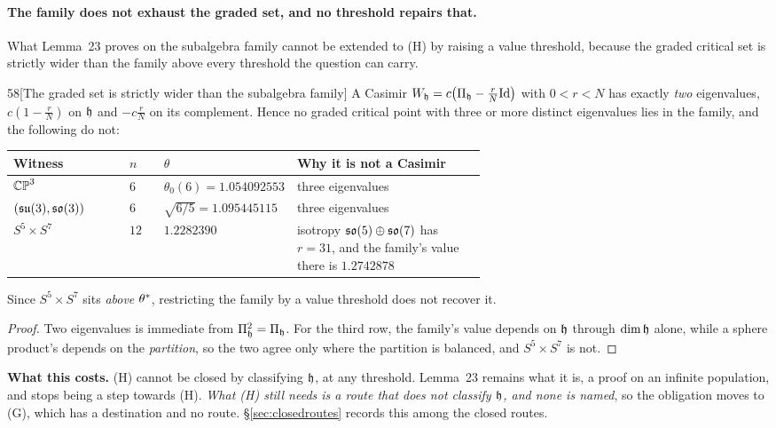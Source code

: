 \paragraph{The family does not exhaust the graded set, and no threshold repairs that.} What Lemma~23 proves on the subalgebra family cannot be extended to (H) by raising a value threshold, because the graded critical set is strictly wider than the family above every threshold the question can carry.

\begin{Lem}{58}[The graded set is strictly wider than the subalgebra family]
A Casimir $W_{\mathfrak{h}}=c\big(\Pi_{\mathfrak{h}}-\tfrac rN\mathrm{Id}\big)$ with $0<r<N$ has exactly \emph{two} eigenvalues, $c(1-\tfrac rN)$ on $\mathfrak{h}$ and $-c\tfrac rN$ on its complement. Hence no graded critical point with three or more distinct eigenvalues lies in the family, and the following do not:
\begin{center}
\begin{tabular}{@{}llp{0.22\linewidth}p{0.40\linewidth}@{}}
\toprule
Witness & $n$ & $\theta$ & Why it is not a Casimir \\
\midrule
$\mathbb{CP}^3$ & $6$ & $\theta_0(6)=1.054092553$ & three eigenvalues \\
$(\mathfrak{su}(3),\mathfrak{so}(3))$ & $6$ & $\sqrt{6/5}=1.095445115$ & three eigenvalues \\
$S^5\times S^7$ & $12$ & $1.2282390$ & isotropy $\mathfrak{so}(5)\oplus\mathfrak{so}(7)$ has $r=31$, and the family's value there is $1.2742878$ \\
\bottomrule
\end{tabular}
\end{center}
Since $S^5\times S^7$ sits \emph{above} $\theta^{*}$, restricting the family by a value threshold does not recover it.
\end{Lem}

\begin{proof}
Two eigenvalues is immediate from $\Pi_{\mathfrak{h}}^2=\Pi_{\mathfrak{h}}$. For the third row, the family's value depends on $\mathfrak{h}$ through $\dim\mathfrak{h}$ alone, while a sphere product's depends on the \emph{partition}, so the two agree only where the partition is balanced, and $S^5\times S^7$ is not.
\end{proof}

\noindent\textbf{What this costs.} (H) cannot be closed by classifying $\mathfrak{h}$, at any threshold. Lemma~23 remains what it is, a proof on an infinite population, and stops being a step towards (H). \emph{What (H) still needs is a route that does not classify $\mathfrak{h}$, and none is named}, so the obligation moves to (G), which has a destination and no route. \S\ref{sec:closedroutes} records this among the closed routes.

